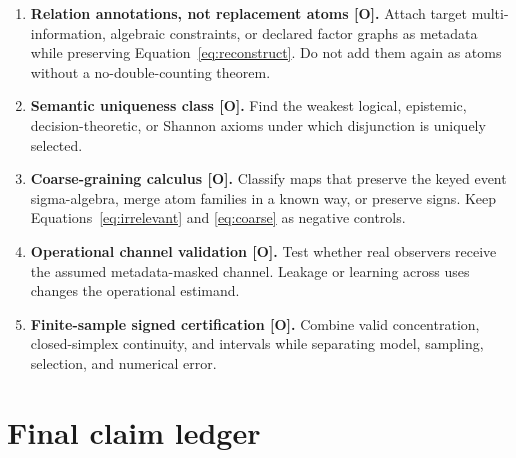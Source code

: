 \documentclass[11pt]{article}
\newcommand{\evidence}[1]{\textbf{[#1]}}
\begin{document}
\begin{enumerate}
  \item \textbf{Relation annotations, not replacement atoms \evidence{O}.}
        Attach target multi-information, algebraic constraints, or declared
        factor graphs as metadata while preserving
        Equation~\eqref{eq:reconstruct}.  Do not add them again as atoms without
        a no-double-counting theorem.
  \item \textbf{Semantic uniqueness class \evidence{O}.}  Find the weakest
        logical, epistemic, decision-theoretic, or Shannon axioms under which
        disjunction is uniquely selected.
  \item \textbf{Coarse-graining calculus \evidence{O}.}  Classify maps that
        preserve the keyed event sigma-algebra, merge atom families in a known
        way, or preserve signs.  Keep Equations~\eqref{eq:irrelevant} and
        \eqref{eq:coarse} as negative controls.
  \item \textbf{Operational channel validation \evidence{O}.}  Test whether
        real observers receive the assumed metadata-masked channel.  Leakage or
        learning across uses changes the operational estimand.
  \item \textbf{Finite-sample signed certification \evidence{O}.}  Combine
        valid concentration, closed-simplex continuity, and intervals while
        separating model, sampling, selection, and numerical error.
\end{enumerate}

\section{Final claim ledger}
\end{document}
